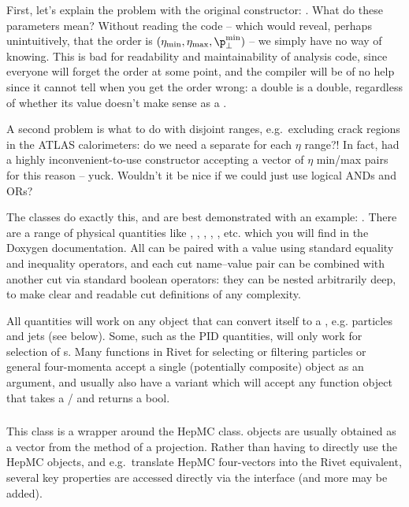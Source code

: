 First, let's explain the problem with the original 
constructor: . What do these parameters
mean? Without reading the code -- which would reveal, perhaps unintuitively,
that the order is $(\eta_\text{min}, \eta_\text{max}, \p_\perp^\text{min})$ --
we simply have no way of knowing. This is bad for readability and
maintainability of analysis code, since everyone will forget the order at some
point, and the compiler will be of no help since it cannot tell when you get the
order wrong: a double is a double, regardless of whether its value doesn't make
sense as a \pT.

A second problem is what to do with disjoint ranges, e.g.~excluding crack
regions in the ATLAS calorimeters: do we need a separate  for
each $\eta$ range?! In fact,  had a highly inconvenient-to-use
constructor accepting a vector of $\eta$ min/max pairs for this reason --
yuck. Wouldn't it be nice if we could just use logical ANDs and ORs?

The  classes do exactly this, and are best demonstrated with an
example: . There
are a range of physical quantities like , ,
, , , etc. which you will
find in the Doxygen documentation. All can be paired with a value using standard
equality and inequality operators, and each cut name--value pair can be combined
with another cut via standard boolean operators: they can be nested arbitrarily
deep, to make clear and readable cut definitions of any complexity.

All  quantities will work on any object that can convert itself to a
, e.g. particles and jets (see below). Some, such as the PID
quantities, will only work for selection of s. Many functions in
Rivet for selecting or filtering particles or general four-momenta accept a
single (potentially composite)  object as an argument, and usually
also have a variant which will accept any function object that takes a
/ and returns a bool.


\subsubsection{}
This class is a wrapper around the HepMC 
class.  objects are usually obtained as a vector from the
 method of a  projection. Rather than having
to directly use the HepMC objects, and e.g.~translate HepMC four-vectors into
the Rivet equivalent, several key properties are accessed directly via the
 interface (and more may be added).

